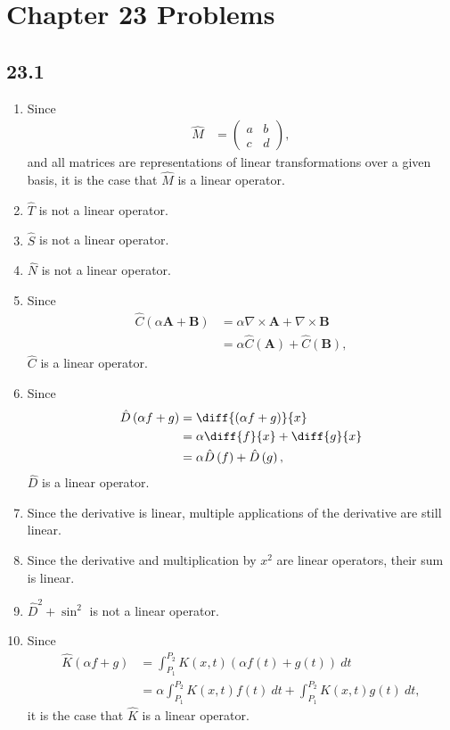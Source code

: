 \documentclass[12pt]{mypackage}
\begin{document}
\RaggedRight
\section{Chapter 23 Problems}%
\subsection{23.1}%
\begin{enumerate}
  \item Since
    \begin{align*}
      \hat{M} &= \begin{pmatrix}a & b \\ c & d\end{pmatrix},
    \end{align*}
    and all matrices are representations of linear transformations over a given basis, it is the case that $\hat{M}$ is a linear operator.
  \item $\hat{T}$ is not a linear operator.
  \item $\hat{S}$ is not a linear operator.
  \item $\hat{N}$ is not a linear operator.
  \item Since
    \begin{align*}
      \hat{C}\left(\alpha \mathbf{A} + \mathbf{B}\right) &= \alpha \nabla \times \mathbf{A} + \nabla \times \mathbf{B}\\
                                                         &= \alpha \hat{C}\left(\mathbf{A}\right) + \hat{C}\left(\mathbf{B}\right),
    \end{align*}
    $\hat{C}$ is a linear operator.
  \item Since
    \begin{align*}
      \hat{D}\left(\alpha f + g\right) &= \diff{\left(\alpha f + g\right)}{x}\\
                                       &= \alpha \diff{f}{x} + \diff{g}{x}\\
                                       &= \alpha\hat{D}\left(f\right) + \hat{D}\left(g\right),
    \end{align*}
    $\hat{D}$ is a linear operator.
  \item Since the derivative is linear, multiple applications of the derivative are still linear.
  \item Since the derivative and multiplication by $x^2$ are linear operators, their sum is linear.
  \item $\hat{D}^2 + \sin^2$ is not a linear operator.
  \item Since
    \begin{align*}
      \hat{K}\left(\alpha f + g\right) &= \int_{P_1}^{P_2} K\left(x,t\right)\left(\alpha f(t) + g(t)\right)\:dt\\
                                       &= \alpha \int_{P_1}^{P_2} K(x,t)f(t)\:dt + \int_{P_1}^{P_2} K\left(x,t\right)g(t)\:dt,
    \end{align*}
    it is the case that $\hat{K}$ is a linear operator.
\end{enumerate}
\end{document}
